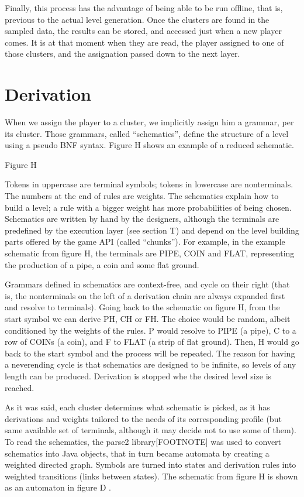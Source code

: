 \documentclass[conference]{IEEEtran}
\begin{document}
Finally, this process has the advantage of being able to be run offline, that is, previous to the actual level generation. Once the clusters are found in the sampled data, the results can be stored, and accessed just when a new player comes. It is at that moment when they are read, the player assigned to one of those clusters, and the assignation passed down to the next layer.




\section{Derivation}

When we assign the player to a cluster, we implicitly assign him a grammar, per its cluster. Those grammars, called ``schematics'', define the structure of a level using a pseudo BNF syntax. Figure H shows an example of a reduced schematic.

Figure H

Tokens in uppercase are terminal symbols; tokens in lowercase are nonterminals. The numbers at the end of rules are weights. The schematics explain how to build a level; a rule with a bigger weight has more probabilities of being chosen. Schematics are written by hand by the designers, although the terminals are predefined by the execution layer (see section T) and depend on the level building parts offered by the game API (called ``chunks''). For example, in the example schematic from figure H, the terminals are PIPE, COIN and FLAT, representing the production of a pipe, a coin and some flat ground.

Grammars defined in schematics are context-free, and cycle on their right (that is, the nonterminals on the left of a derivation chain are always expanded first and resolve to terminals). Going back to the schematic on figure H, from the start symbol we can derive PH, CH or FH. The choice would be random, albeit conditioned by the weights of the rules. P would resolve to PIPE (a pipe), C to a row of COINs (a coin), and F to FLAT (a strip of flat ground). Then, H would go back to the start symbol and the process will be repeated. The reason for having a neverending cycle is that schematics are designed to be infinite, so levels of any length can be produced. Derivation is stopped whe the desired level size is reached.

As it was said, each cluster determines what schematic is picked, as it has derivations and weights tailored to the needs of its corresponding profile (but same available set of terminals, although it may decide not to use some of them). To read the schematics, the parse2 library[FOOTNOTE] was used to convert schematics into Java objects, that in turn became automata by creating a weighted directed graph. Symbols are turned into states and derivation rules into weighted transitions (links between states). The schematic from figure H is shown as an automaton in figure D .
\end{document}
